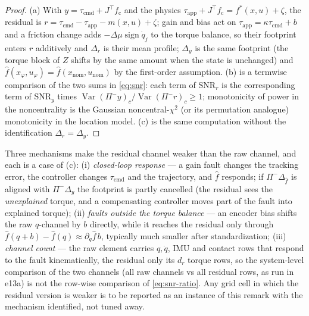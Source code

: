 \begin{proof}
(a) With $y = \tau_{\mathrm{cmd}} + J^\top f_{\mathrm{c}}$ and the physics
$\tau_{\mathrm{app}} + J^\top f_{\mathrm{c}} = f^{*}(x,u) + \zeta$, the
residual is $r = \tau_{\mathrm{cmd}} - \tau_{\mathrm{app}} - m(x,u) + \zeta$;
gain and bias act on $\tau_{\mathrm{app}} = \kappa\tau_{\mathrm{cmd}} + b$
and a friction change adds $-\Delta\mu\operatorname{sign}\dot q_j$ to the
torque balance, so their footprint enters $r$ additively and $\Delta_r$ is
their mean profile; $\Delta_y$ is the same footprint (the torque block of
$Z$ shifts by the same amount when the state is unchanged) and
$\hat f(x_\varphi,u_\varphi) = \hat f(x_{\mathrm{nom}},u_{\mathrm{nom}})$
by the first-order assumption. (b) is a termwise comparison of the two sums
in \eqref{eq:snr}: each term of $\mathrm{SNR}_r$ is the corresponding term
of $\mathrm{SNR}_y$ times $\operatorname{Var}(\Pi^-y)_c/\operatorname{Var}(\Pi^-r)_c
\ge 1$; monotonicity of power in the noncentrality is the Gaussian
noncentral-$\chi^2$ (or its permutation analogue) monotonicity in the
location model. (c) is the same computation without the identification
$\Delta_r = \Delta_y$.
\end{proof}

\begin{remark}
\label{rem:residual-weaker}
Three mechanisms make the residual channel weaker than the raw channel, and
each is a case of (c): (i) \emph{closed-loop response} --- a gain fault
changes the tracking error, the controller changes $\tau_{\mathrm{cmd}}$ and
the trajectory, and $\hat f$ responds; if $\Pi^-\Delta_{\hat f}$ is aligned
with $\Pi^-\Delta_y$ the footprint is partly cancelled (the residual sees the
\emph{unexplained} torque, and a compensating controller moves part of the
fault into explained torque); (ii) \emph{faults outside the torque balance}
--- an encoder bias shifts the raw $q$-channel by $b$ directly, while it
reaches the residual only through $\hat f(q+b) - \hat f(q) \approx
\partial_q\hat f\, b$, typically much smaller after standardization; (iii)
\emph{channel count} --- the raw element carries $q,\dot q$, IMU and contact
rows that respond to the fault kinematically, the residual only its $d_r$
torque rows, so the system-level comparison of the two channels (all raw
channels vs all residual rows, as run in e13a) is not the row-wise
comparison of \eqref{eq:snr-ratio}. Any grid cell in which the residual
version is weaker is to be reported as an instance of this remark with the
mechanism identified, not tuned away.
\end{remark}

